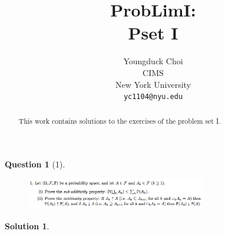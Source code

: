 \documentclass{article} %
\title{ProbLimI: \\
Pset I}
\author{
Youngduck Choi \\
CIMS \\
New York University\\
\texttt{yc1104@nyu.edu} \\
}
\theoremstyle{quest}
\newtheorem*{question}{Question}
\newtheorem*{solution}{Solution}
\begin{document}
\maketitle

\begin{abstract}
This work contains solutions to the exercises of the problem set I.
\end{abstract}

\bigskip

\begin{question}[1]
\hfill
\begin{figure}[h!]
  \centering
    \includegraphics[width=0.7\textwidth]{problim-e1-p1.png}
\end{figure}
\end{question}
\begin{solution} \hfill \\

\end{solution}

\newpage
\end{document}
